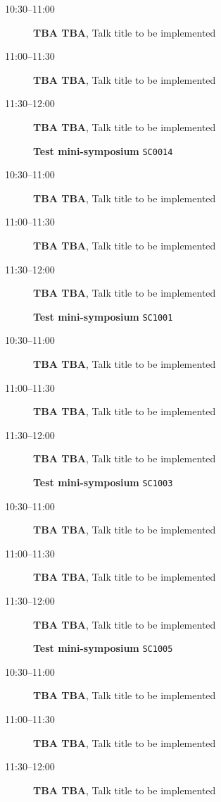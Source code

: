 \documentclass[ILAS2025-program.tex]{subfiles}
\begin{document}
\begin{description}
\begin{description}
    \item[10:30--11:00] \textbf{TBA TBA}, Talk title to be implemented
        \item[11:00--11:30] \textbf{TBA TBA}, Talk title to be implemented
        \item[11:30--12:00] \textbf{TBA TBA}, Talk title to be implemented
        \end{description}
    \begin{description}
    \item[] \textbf{Test mini-symposium} {\footnotesize\texttt{SC0014}}
    \item[10:30--11:00] \textbf{TBA TBA}, Talk title to be implemented
        \item[11:00--11:30] \textbf{TBA TBA}, Talk title to be implemented
        \item[11:30--12:00] \textbf{TBA TBA}, Talk title to be implemented
        \end{description}
    \begin{description}
    \item[] \textbf{Test mini-symposium} {\footnotesize\texttt{SC1001}}
    \item[10:30--11:00] \textbf{TBA TBA}, Talk title to be implemented
        \item[11:00--11:30] \textbf{TBA TBA}, Talk title to be implemented
        \item[11:30--12:00] \textbf{TBA TBA}, Talk title to be implemented
        \end{description}
    \begin{description}
    \item[] \textbf{Test mini-symposium} {\footnotesize\texttt{SC1003}}
    \item[10:30--11:00] \textbf{TBA TBA}, Talk title to be implemented
        \item[11:00--11:30] \textbf{TBA TBA}, Talk title to be implemented
        \item[11:30--12:00] \textbf{TBA TBA}, Talk title to be implemented
        \end{description}
    \begin{description}
    \item[] \textbf{Test mini-symposium} {\footnotesize\texttt{SC1005}}
    \item[10:30--11:00] \textbf{TBA TBA}, Talk title to be implemented
        \item[11:00--11:30] \textbf{TBA TBA}, Talk title to be implemented
        \item[11:30--12:00] \textbf{TBA TBA}, Talk title to be implemented

\end{description}
\end{description}
\end{document}
